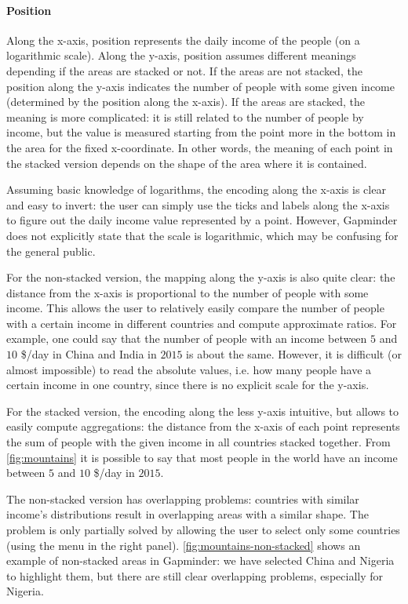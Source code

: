 \paragraph{Position}
Along the x-axis, position represents the daily income of the people (on a logarithmic scale).
Along the y-axis, position assumes different meanings depending if the areas are stacked or not.
If the areas are not stacked, the position along the y-axis indicates the number of people with some given income (determined by the position along the x-axis).
If the areas are stacked, the meaning is more complicated:
it is still related to the number of people by income, but the value is measured starting from the point more in the bottom in the area for the fixed x-coordinate.
In other words, the meaning of each point in the stacked version depends on the shape of the area where it is contained.

Assuming basic knowledge of logarithms, the encoding along the x-axis is clear and easy to invert:
the user can simply use the ticks and labels along the x-axis to figure out the daily income value represented by a point.
However, Gapminder does not explicitly state that the scale is logarithmic, which may be confusing for the general public.

For the non-stacked version, the mapping along the y-axis is also quite clear:
the distance from the x-axis is proportional to the number of people with some income.
This allows the user to relatively easily compare the number of people with a certain income in different countries and compute approximate ratios.
For example, one could say that the number of people with an income between $5$ and $10$ \$/day in China and India in $2015$ is about the same.
However, it is difficult (or almost impossible) to read the absolute values, i.e. how many people have a certain income in one country, since there is no explicit scale for the y-axis.

For the stacked version, the encoding along the less y-axis intuitive, but allows to easily compute aggregations:
the distance from the x-axis of each point represents the sum of people with the given income in all countries stacked together.
From \cref{fig:mountains} it is possible to say that most people in the world have an income between $5$ and $10$ \$/day in $2015$.

The non-stacked version has overlapping problems:
countries with similar income's distributions result in overlapping areas with a similar shape.
The problem is only partially solved by allowing the user to select only some countries (using the menu in the right panel).
\cref{fig:mountains-non-stacked} shows an example of non-stacked areas in Gapminder:
we have selected China and Nigeria to highlight them, but there are still clear overlapping problems, especially for Nigeria.

